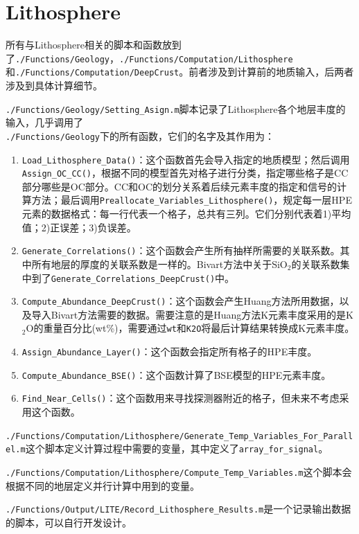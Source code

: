 		\section{Lithosphere}
			所有与Lithosphere相关的脚本和函数放到了\texttt{./Functions/Geology}，\texttt{./Functions/Computation/Lithosphere}和\texttt{./Functions/Computation/DeepCrust}。前者涉及到计算前的地质输入，后两者涉及到具体计算细节。\par
			\texttt{./Functions/Geology/Setting\_Asign.m}脚本记录了Lithosphere各个地层丰度的输入，几乎调用了\\
			\texttt{./Functions/Geology}下的所有函数，它们的名字及其作用为：
				\begin{enumerate}
					\item \texttt{Load\_Lithosphere\_Data()}：这个函数首先会导入指定的地质模型；然后调用\texttt{Assign\_OC\_CC()}，根据不同的模型首先对格子进行分类，指定哪些格子是CC部分哪些是OC部分。CC和OC的划分关系着后续元素丰度的指定和信号的计算方法；最后调用\texttt{Preallocate\_Variables\_Lithosphere()}，规定每一层HPE元素的数据格式：每一行代表一个格子，总共有三列。它们分别代表着1)平均值；2)正误差；3)负误差。
					\item \texttt{Generate\_Correlations()}：这个函数会产生所有抽样所需要的关联系数。其中所有地层的厚度的关联系数是一样的。Bivart方法中关于SiO${}_2$的关联系数集中到了\texttt{Generate\_Correlations\_DeepCrust()}中。
					\item \texttt{Compute\_Abundance\_DeepCrust()}：这个函数会产生Huang方法所用数据，以及导入Bivart方法需要的数据。需要注意的是Huang方法K元素丰度采用的是K${}_2$O的重量百分比(wt\%)，需要通过\texttt{wt}和\texttt{K2O}将最后计算结果转换成K元素丰度。
					\item \texttt{Assign\_Abundance\_Layer()}：这个函数会指定所有格子的HPE丰度。
					\item \texttt{Compute\_Abundance\_BSE()}：这个函数计算了BSE模型的HPE元素丰度。
					\item \texttt{Find\_Near\_Cells()}：这个函数用来寻找探测器附近的格子，但未来不考虑采用这个函数。
				\end{enumerate}
			\par
			\texttt{./Functions/Computation/Lithosphere/Generate\_Temp\_Variables\_For\_Parallel.m}这个脚本定义计算过程中需要的变量，其中定义了\texttt{array\_for\_signal}。\par
			\texttt{./Functions/Computation/Lithosphere/Compute\_Temp\_Variables.m}这个脚本会根据不同的地层定义并行计算中用到的变量。\par
			\texttt{./Functions/Output/LITE/Record\_Lithosphere\_Results.m}是一个记录输出数据的脚本，可以自行开发设计。\par
